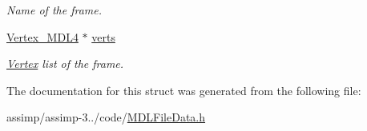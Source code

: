 \begin{DoxyCompactItemize}
\begin{DoxyCompactList}\small\item\em Name of the frame. \end{DoxyCompactList}\item 
\hypertarget{struct_assimp_1_1_m_d_l_1_1_simple_frame___m_d_ln___s_p_aec9bd58def201f2ce7f775e579273b07}{\hyperlink{struct_assimp_1_1_m_d_l_1_1_vertex___m_d_l4}{Vertex\+\_\+\+M\+D\+L4} $\ast$ \hyperlink{struct_assimp_1_1_m_d_l_1_1_simple_frame___m_d_ln___s_p_aec9bd58def201f2ce7f775e579273b07}{verts}}\label{struct_assimp_1_1_m_d_l_1_1_simple_frame___m_d_ln___s_p_aec9bd58def201f2ce7f775e579273b07}

\begin{DoxyCompactList}\small\item\em \hyperlink{struct_assimp_1_1_m_d_l_1_1_vertex}{Vertex} list of the frame. \end{DoxyCompactList}\end{DoxyCompactItemize}


The documentation for this struct was generated from the following file\+:\begin{DoxyCompactItemize}
\item 
assimp/assimp-\/3../code/\hyperlink{_m_d_l_file_data_8h}{M\+D\+L\+File\+Data.\+h}\end{DoxyCompactItemize}

